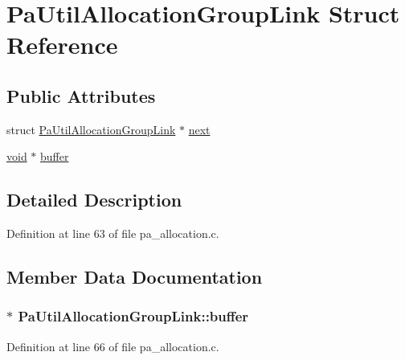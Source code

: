 \hypertarget{struct_pa_util_allocation_group_link}{}\section{Pa\+Util\+Allocation\+Group\+Link Struct Reference}
\label{struct_pa_util_allocation_group_link}
\subsection*{Public Attributes}
\begin{DoxyCompactItemize}
\item 
struct \hyperlink{struct_pa_util_allocation_group_link}{Pa\+Util\+Allocation\+Group\+Link} $\ast$ \hyperlink{struct_pa_util_allocation_group_link_a3b1739dedb3c039356364a3f2af239ec}{next}
\item 
\hyperlink{sound_8c_ae35f5844602719cf66324f4de2a658b3}{void} $\ast$ \hyperlink{struct_pa_util_allocation_group_link_a561613ae4eccf10ad1737aadcb2014f7}{buffer}
\end{DoxyCompactItemize}


\subsection{Detailed Description}


Definition at line 63 of file pa\+\_\+allocation.\+c.



\subsection{Member Data Documentation}
\subsubsection[{\texorpdfstring{buffer}{buffer}}]{$\ast$ Pa\+Util\+Allocation\+Group\+Link\+::buffer}\hypertarget{struct_pa_util_allocation_group_link_a561613ae4eccf10ad1737aadcb2014f7}{}\label{struct_pa_util_allocation_group_link_a561613ae4eccf10ad1737aadcb2014f7}


Definition at line 66 of file pa\+\_\+allocation.\+c.

